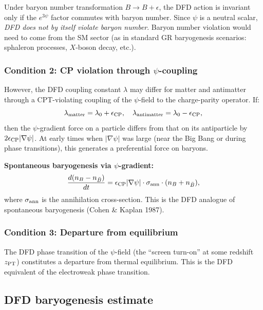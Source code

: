 \documentclass[11pt]{article}
\begin{document}
Under baryon number transformation $B \to B + \epsilon$, the DFD action
is invariant only if the $e^{3\psi}$ factor commutes with baryon number.
Since $\psi$ is a neutral scalar, \emph{DFD does not by itself violate
baryon number}.  Baryon number violation would need to come from the SM
sector (as in standard GR baryogenesis scenarios: sphaleron processes,
$X$-boson decay, etc.).

\subsubsection{Condition 2: CP violation through $\psi$-coupling}

However, the DFD coupling constant $\lambda$ may differ for matter and
antimatter through a CPT-violating coupling of the $\psi$-field to the
charge-parity operator.  If:
\begin{equation}
  \lambda_{\rm matter} = \lambda_0 + \epsilon_{\rm CP},
  \quad
  \lambda_{\rm antimatter} = \lambda_0 - \epsilon_{\rm CP},
\end{equation}
then the $\psi$-gradient force on a particle differs from that on its
antiparticle by $2\epsilon_{\rm CP}|\nabla\psi|$.  At early times when
$|\nabla\psi|$ was large (near the Big Bang or during phase transitions),
this generates a preferential force on baryons.

\textbf{Spontaneous baryogenesis via $\psi$-gradient:}
\begin{equation}\label{eq:spont-baryogenesis}
  \frac{d(n_B - n_{\bar B})}{dt} = \epsilon_{\rm CP}|\nabla\psi|\cdot\sigma_{\rm ann}
  \cdot(n_B + n_{\bar B}),
\end{equation}
where $\sigma_{\rm ann}$ is the annihilation cross-section.  This is
the DFD analogue of spontaneous baryogenesis (Cohen \& Kaplan 1987).

\subsubsection{Condition 3: Departure from equilibrium}

The DFD phase transition of the $\psi$-field (the ``screen turn-on'' at
some redshift $z_{\rm PT}$) constitutes a departure from thermal equilibrium.
This is the DFD equivalent of the electroweak phase transition.

\subsection{DFD baryogenesis estimate}
\end{document}
